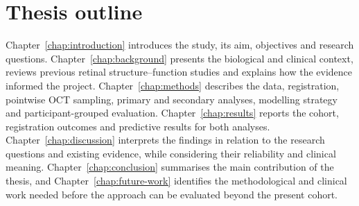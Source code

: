 \section{Thesis outline}

Chapter~\ref{chap:introduction} introduces the study, its aim, objectives and research questions. Chapter~\ref{chap:background} presents the biological and clinical context, reviews previous retinal structure--function studies and explains how the evidence informed the project. Chapter~\ref{chap:methods} describes the data, registration, pointwise OCT sampling, primary and secondary analyses, modelling strategy and participant-grouped evaluation. Chapter~\ref{chap:results} reports the cohort, registration outcomes and predictive results for both analyses. Chapter~\ref{chap:discussion} interprets the findings in relation to the research questions and existing evidence, while considering their reliability and clinical meaning. Chapter~\ref{chap:conclusion} summarises the main contribution of the thesis, and Chapter~\ref{chap:future-work} identifies the methodological and clinical work needed before the approach can be evaluated beyond the present cohort.
